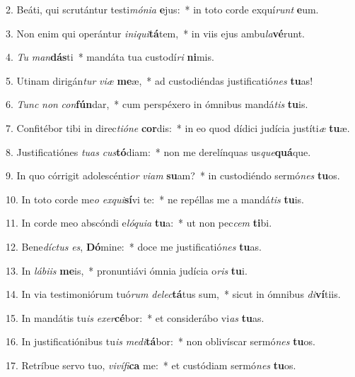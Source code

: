 2. Beáti, qui scrutántur testi\textit{mó}\textit{ni}\textit{a} \textbf{e}jus:~*  in toto corde exquí\textit{runt} \textbf{e}um.\

3. Non enim qui operántur \textit{in}\textit{i}\textit{qui}\textbf{tá}tem,~*  in viis ejus ambu\textit{la}\textbf{vé}runt.\

4. \textit{Tu} \textit{man}\textbf{dás}ti~*  mandáta tua custodí\textit{ri} \textbf{ni}mis.\

5. Utinam dirigán\textit{tur} \textit{vi}\textit{æ} \textbf{me}æ,~*  ad custodiéndas justificatió\textit{nes} \textbf{tu}as!\

6. \textit{Tunc} \textit{non} \textit{con}\textbf{fún}dar,~*  cum perspéxero in ómnibus mandá\textit{tis} \textbf{tu}is.\

7. Confitébor tibi in direc\textit{ti}\textit{ó}\textit{ne} \textbf{cor}dis:~*  in eo quod dídici judícia justíti\textit{æ} \textbf{tu}æ.\

8. Justificatiónes \textit{tu}\textit{as} \textit{cus}\textbf{tó}diam:~*  non me derelínquas us\textit{que}\textbf{quá}que.\

9. In quo córrigit adolescénti\textit{or} \textit{vi}\textit{am} \textbf{su}am?~*  in custodiéndo sermó\textit{nes} \textbf{tu}os.\

10. In toto corde me\textit{o} \textit{ex}\textit{qui}\textbf{sí}vi te:~*  ne repéllas me a mandá\textit{tis} \textbf{tu}is.\

11. In corde meo abscóndi e\textit{ló}\textit{qui}\textit{a} \textbf{tu}a:~*  ut non pec\textit{cem} \textbf{ti}bi.\

12. Bene\textit{díc}\textit{tus} \textit{es}, \textbf{Dó}mine:~*  doce me justificatió\textit{nes} \textbf{tu}as.\

13. In \textit{lá}\textit{bi}\textit{is} \textbf{me}is,~*  pronuntiávi ómnia judícia o\textit{ris} \textbf{tu}i.\

14. In via testimoniórum tuó\textit{rum} \textit{de}\textit{lec}\textbf{tá}tus sum,~*  sicut in ómnibus \textit{di}\textbf{ví}tiis.\

15. In mandátis tu\textit{is} \textit{ex}\textit{er}\textbf{cé}bor:~*  et considerábo vi\textit{as} \textbf{tu}as.\

16. In justificatiónibus tu\textit{is} \textit{me}\textit{di}\textbf{tá}bor:~*  non oblivíscar sermó\textit{nes} \textbf{tu}os.\

17. Retríbue servo tuo, \textit{vi}\textit{ví}\textit{fi}\textbf{ca} me:~*  et custódiam sermó\textit{nes} \textbf{tu}os.\

